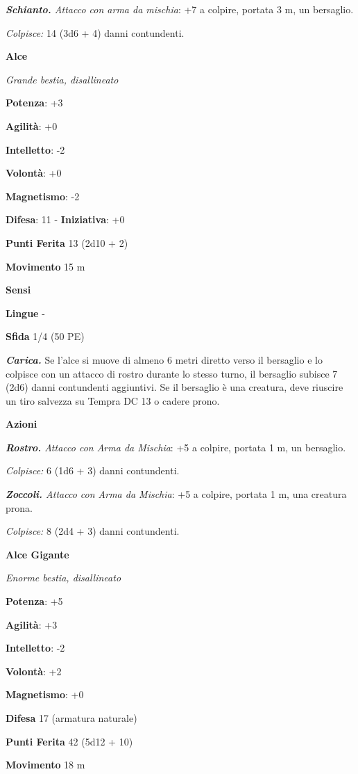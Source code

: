 \begin{multicols}{2}
\emph{\textbf{Schianto.} Attacco con arma da mischia}: +7 a colpire,
portata 3 m, un bersaglio.

\emph{Colpisce:} 14 (3d6 + 4) danni contundenti.

\textbf{Alce}

\emph{Grande bestia, disallineato}

\textbf{Potenza}: +3

\textbf{Agilità}: +0

\textbf{Intelletto}: -2

\textbf{Volontà}: +0

\textbf{Magnetismo}: -2

\textbf{Difesa}: 11 - \textbf{Iniziativa}: +0

\textbf{Punti Ferita} 13 (2d10 + 2)

\textbf{Movimento} 15 m

\textbf{Sensi} 

\textbf{Lingue} -

\textbf{Sfida} 1/4 (50 PE)\smallskip

\emph{\textbf{Carica.}} Se l'alce si muove di almeno 6 metri diretto
verso il bersaglio e lo colpisce con un attacco di rostro durante lo
stesso turno, il bersaglio subisce 7 (2d6) danni contundenti aggiuntivi.
Se il bersaglio è una creatura, deve riuscire un tiro salvezza su Tempra
DC 13 o cadere prono.

\smallskip\textbf{Azioni}

\emph{\textbf{Rostro.} Attacco con Arma da Mischia}: +5 a colpire,
portata 1 m, un bersaglio.

\emph{Colpisce:} 6 (1d6 + 3) danni contundenti.

\emph{\textbf{Zoccoli.} Attacco con Arma da Mischia}: +5 a colpire,
portata 1 m, una creatura prona.

\emph{Colpisce:} 8 (2d4 + 3) danni contundenti.

\textbf{Alce Gigante}

\emph{Enorme bestia, disallineato}

\textbf{Potenza}: +5

\textbf{Agilità}: +3

\textbf{Intelletto}: -2

\textbf{Volontà}: +2

\textbf{Magnetismo}: +0

\textbf{Difesa} 17 (armatura naturale)

\textbf{Punti Ferita} 42 (5d12 + 10)

\textbf{Movimento} 18 m


\end{multicols}

